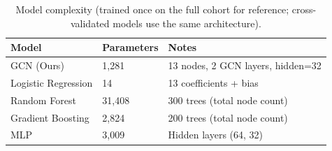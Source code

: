 \begin{table}[t]
\centering
\caption{Model complexity (trained once on the full cohort for reference; cross-validated models use the same architecture).}
\label{tab:complexity}
\footnotesize
\begin{tabular}{lll}
\toprule
Model & Parameters & Notes \\
\midrule
GCN (Ours) & 1,281 & 13 nodes, 2 GCN layers, hidden=32 \\
Logistic Regression & 14 & 13 coefficients + bias \\
Random Forest & 31,408 & 300 trees (total node count) \\
Gradient Boosting & 2,824 & 200 trees (total node count) \\
MLP & 3,009 & Hidden layers (64, 32) \\
\bottomrule
\end{tabular}
\end{table}
